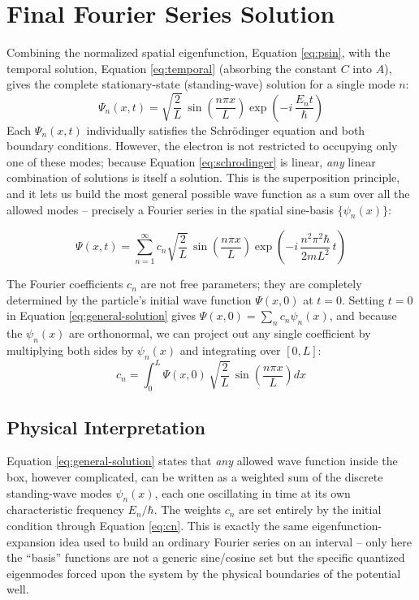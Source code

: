 \documentclass[12pt, a4paper]{article}
\begin{document}
\section{Final Fourier Series Solution}
Combining the normalized spatial eigenfunction, Equation
\eqref{eq:psin}, with the temporal solution, Equation
\eqref{eq:temporal} (absorbing the constant $C$ into $A$), gives the
complete stationary-state (standing-wave) solution for a single mode
$n$:
\begin{equation}
    \Psi_n(x,t) = \sqrt{\frac{2}{L}}\, \sin\!\left(\frac{n\pi x}{L}\right)
    \exp\!\left(-i\,\frac{E_n t}{\hbar}\right)
    \label{eq:mode-n}
\end{equation}
Each $\Psi_n(x,t)$ individually satisfies the Schr\"odinger equation
and both boundary conditions. However, the electron is not restricted
to occupying only one of these modes; because Equation
\eqref{eq:schrodinger} is linear, \emph{any} linear combination of
solutions is itself a solution. This is the superposition principle,
and it lets us build the most general possible wave function as a sum
over all the allowed modes -- precisely a Fourier series in the
spatial sine-basis $\{\psi_n(x)\}$:
\begin{resultbox}
\begin{equation}
    \Psi(x,t) = \sum_{n=1}^{\infty} c_n \sqrt{\frac{2}{L}}\,
    \sin\!\left(\frac{n\pi x}{L}\right)
    \exp\!\left(-i\, \frac{n^2\pi^2\hbar}{2mL^2}\, t\right)
    \label{eq:general-solution}
\end{equation}
\end{resultbox}

The Fourier coefficients $c_n$ are not free parameters; they are
completely determined by the particle's initial wave function
$\Psi(x,0)$ at $t=0$. Setting $t=0$ in Equation
\eqref{eq:general-solution} gives
$\Psi(x,0) = \sum_n c_n \psi_n(x)$, and because the $\psi_n(x)$ are
orthonormal, we can project out any single coefficient by multiplying
both sides by $\psi_n(x)$ and integrating over $[0,L]$:
\begin{equation}
    c_n = \int_0^L \Psi(x,0)\, \sqrt{\frac{2}{L}}\, \sin\!\left(\frac{n\pi x}{L}\right) dx
    \label{eq:cn}
\end{equation}

\subsection*{Physical Interpretation}
Equation \eqref{eq:general-solution} states that \emph{any} allowed
wave function inside the box, however complicated, can be written as a
weighted sum of the discrete standing-wave modes $\psi_n(x)$, each one
oscillating in time at its own characteristic frequency $E_n/\hbar$.
The weights $c_n$ are set entirely by the initial condition through
Equation \eqref{eq:cn}. This is exactly the same eigenfunction-expansion
idea used to build an ordinary Fourier series on an interval -- only
here the ``basis'' functions are not a generic sine/cosine set but the
specific quantized eigenmodes forced upon the system by the physical
boundaries of the potential well.
\end{document}

